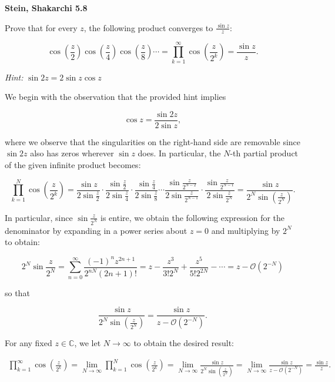 \textbf{Stein, Shakarchi 5.8}

Prove that for every $z$, the following product converges to $\frac{\sin{z}}{z}$:

$$
\cos{\left(\frac{z}{2}\right)} \cos{\left(\frac{z}{4}\right)} \cos{\left(\frac{z}{8}\right)} \cdots 
  = \prod_{k=1}^{\infty} \cos{\left(\frac{z}{2^k}\right)}
  = \frac{\sin{z}}{z}.
$$

\textit{Hint: } $\sin{2z} = 2 \sin{z} \cos{z}$

\begin{solution}
  We begin with the observation that the provided hint implies

  $$
  \cos{z} = \frac{\sin{2z}}{2 \sin{z}},
  $$

  where we observe that the singularities on the right-hand side are removable since $\sin{2 z}$ also has zeros wherever
  $\sin{z}$ does. In particular, the $N$-th partial product of the given infinite product becomes:

  $$
  \prod_{k=1}^{N} \cos{\left(\frac{z}{2^k}\right)} 
    = \frac{\sin{z}}{2 \sin{\frac{z}{2}}} 
      \cdot \frac{\sin{\frac{z}{2}}}{2 \sin{\frac{z}{4}}} 
      \cdot \frac{\sin{\frac{z}{4}}}{2 \sin{\frac{z}{8}}} 
      \cdots \frac{\sin{\frac{z}{2^{N-2}}}}{2 \sin{\frac{z}{2^{N-1}}}}
      \cdot \frac{\sin{\frac{z}{2^{N-1}}}}{2 \sin{\frac{z}{2^N}}}
    = \frac{\sin{z}}{2^N \sin{\left(\frac{z}{2^N}\right)}}.
  $$

  In particular, since $\sin{\frac{z}{2^N}}$ is entire, we obtain the following expression for the denominator by 
  expanding in a power series about $z = 0$ and multiplying by $2^N$ to obtain:

  $$
  2^N \sin{\frac{z}{2^N}} = \sum_{n=0}^{\infty} \frac{(-1)^n z^{2n+1}}{2^{nN} (2n+1)!}
                          = z - \frac{z^3}{3! 2^{N}} + \frac{z^5}{5! 2^{2N}} - \cdots
                          = z - \mathcal{O}\left(2^{-N}\right)
  $$

  so that 

  $$
    \frac{\sin{z}}{2^N \sin{\left(\frac{z}{2^N}\right)}} 
      = \frac{\sin{z}}{z - \mathcal{O} \left(2^{-N}\right)}.
  $$

  For any fixed $z \in \mathbb{C}$, we let $N \to \infty$ to obtain the desired result: 

  \begin{align*}
    \prod_{k=1}^{\infty} \cos{\left(\frac{z}{2^k}\right)}
      = \lim\limits_{N \to \infty} \prod_{k=1}^{N} \cos{\left(\frac{z}{2^k}\right)}
      = \lim\limits_{N \to \infty} \frac{\sin{z}}{2^N \sin{\left(\frac{z}{2^N}\right)}} 
      = \lim\limits_{N \to \infty} \frac{\sin{z}}{z - \mathcal{O} \left(2^{-N}\right)}
      = \frac{\sin{z}}{z}.
  \end{align*}
  \ \\
\end{solution}
